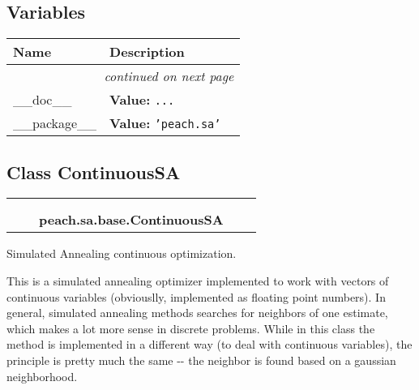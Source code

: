   \subsection{Variables}

    \vspace{-1cm}
\hspace{\varindent}\begin{longtable}{|p{\varnamewidth}|p{\vardescrwidth}|l}
\cline{1-2}
\cline{1-2} \centering \textbf{Name} & \centering \textbf{Description}& \\
\cline{1-2}
\endhead\cline{1-2}\multicolumn{3}{r}{\small\textit{continued on next page}}\\\endfoot\cline{1-2}
\endlastfoot\raggedright \_\-\_\-d\-o\-c\-\_\-\_\- & \raggedright \textbf{Value:} 
{\tt \texttt{...}}&\\
\cline{1-2}
\raggedright \_\-\_\-p\-a\-c\-k\-a\-g\-e\-\_\-\_\- & \raggedright \textbf{Value:} 
{\tt \texttt{'}\texttt{peach.sa}\texttt{'}}&\\
\cline{1-2}
\end{longtable}



\subsection{Class ContinuousSA}

    \label{peach:sa:base:ContinuousSA}
\begin{tabular}{cccccc}
\multicolumn{2}{r}{\settowidth{\BCL}{object}\multirow{2}{\BCL}{object}}
&&
  \\\cline{3-3}
  &&\multicolumn{1}{c|}{}
&&
  \\
&&\multicolumn{2}{l}{\textbf{peach.sa.base.ContinuousSA}}
\end{tabular}


Simulated Annealing continuous optimization.

This is a simulated annealing optimizer implemented to work with vectors of
continuous variables (obviouslly, implemented as floating point numbers). In
general, simulated annealing methods searches for neighbors of one estimate,
which makes a lot more sense in discrete problems. While in this class the
method is implemented in a different way (to deal with continuous
variables), the principle is pretty much the same -{}- the neighbor is found
based on a gaussian neighborhood.

